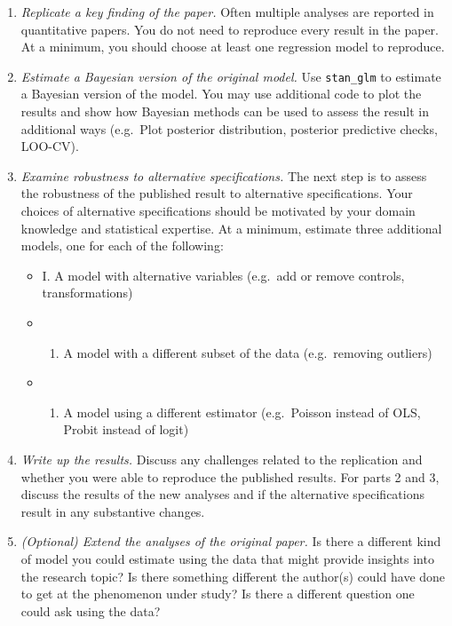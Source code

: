 \documentclass[
  12pt,
]{article}
\providecommand{\tightlist}{%
  \setlength{\itemsep}{0pt}\setlength{\parskip}{0pt}}
\begin{document}
\begin{enumerate}
\def\labelenumi{\arabic{enumi}.}
\tightlist
\item
  \emph{Replicate a key finding of the paper.} Often multiple analyses
  are reported in quantitative papers. You do not need to reproduce
  every result in the paper. At a minimum, you should choose at least
  one regression model to reproduce.
\item
  \emph{Estimate a Bayesian version of the original model.} Use
  \texttt{stan\_glm} to estimate a Bayesian version of the model. You
  may use additional code to plot the results and show how Bayesian
  methods can be used to assess the result in additional ways (e.g.~Plot
  posterior distribution, posterior predictive checks, LOO-CV).
\item
  \emph{Examine robustness to alternative specifications.} The next step
  is to assess the robustness of the published result to alternative
  specifications. Your choices of alternative specifications should be
  motivated by your domain knowledge and statistical expertise. At a
  minimum, estimate three additional models, one for each of the
  following:

  \begin{itemize}
  \item
    I. A model with alternative variables (e.g.~add or remove controls,
    transformations)
  \item
    \begin{enumerate}
    \def\labelenumii{\Roman{enumii}.}
    \setcounter{enumii}{1}
    \tightlist
    \item
      A model with a different subset of the data (e.g.~removing
      outliers)
    \end{enumerate}
  \item
    \begin{enumerate}
    \def\labelenumii{\Roman{enumii}.}
    \setcounter{enumii}{2}
    \tightlist
    \item
      A model using a different estimator (e.g.~Poisson instead of OLS,
      Probit instead of logit)
    \end{enumerate}
  \end{itemize}
\item
  \emph{Write up the results.} Discuss any challenges related to the
  replication and whether you were able to reproduce the published
  results. For parts 2 and 3, discuss the results of the new analyses
  and if the alternative specifications result in any substantive
  changes.
\item
  \emph{(Optional) Extend the analyses of the original paper.} Is there
  a different kind of model you could estimate using the data that might
  provide insights into the research topic? Is there something different
  the author(s) could have done to get at the phenomenon under study? Is
  there a different question one could ask using the data?
\end{enumerate}
\end{document}
